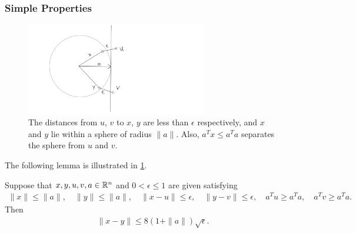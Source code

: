 \subsubsection{Simple Properties}


\begin{figure}[ht]
	\centering
	\includegraphics[width=300px]{images/first_lemma.png}
	\caption{
		The distances from $u$, $v$ to $x$, $y$ are less than $\epsilon$ respectively, and $x$ and $y$ lie within a sphere of radius $\|a\|$.
		Also, $a^Tx \le a^Ta$ separates the sphere from $u$ and $v$.
	}
	\label{first_lemma}
\end{figure}
The following lemma is illustrated in \cref{first_lemma}.
\begin{lemma}
\label{properties_of_a_circle}
Suppose that $x, y, u, v, a \in \mathbb R^n$ and $0 < \epsilon \le 1$ are given satisfying
\begin{align*}
\|x\| \le \|a\|, \quad
\|y \| \le \|a\|, \quad
\|x - u \| \le \epsilon, \quad
\|y - v \| \le \epsilon, \quad
a^T u \ge a^T a, \quad
a^T v \ge a^T a.
\end{align*}
Then
\begin{align*}
\|x - y\| \le 8(1 + \|a\|) \sqrt{\epsilon}.
\end{align*}
\end{lemma}
